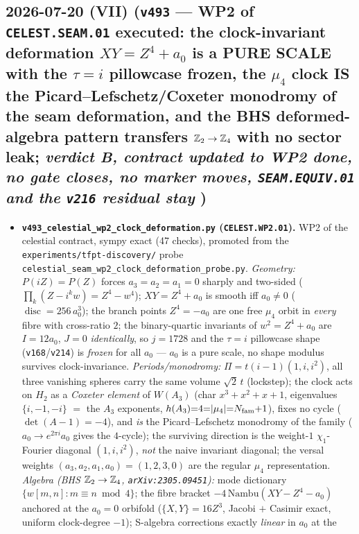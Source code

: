 \subsection*{2026-07-20 (VII) (\texttt{v493} --- WP2 of \texttt{CELEST.SEAM.01} executed: the clock-invariant deformation $XY{=}Z^4{+}a_0$ is a PURE SCALE with the $\tau{=}i$ pillowcase frozen, the $\mu_4$ clock IS the Picard--Lefschetz/Coxeter monodromy of the seam deformation, and the BHS deformed-algebra pattern transfers $\mathbb{Z}_2\to\mathbb{Z}_4$ with no sector leak; \emph{verdict B, contract updated to WP2 done, no gate closes, no marker moves, \texttt{SEAM.EQUIV.01} and the \texttt{v216} residual stay \mO})}
\begin{itemize}[leftmargin=1.5em]
\item \textbf{\texttt{v493\_celestial\_wp2\_clock\_deformation.py} (\texttt{CELEST.WP2.01}).} WP2 of the
celestial contract, sympy exact (47 checks), promoted from the \texttt{experiments/tfpt-discovery/}
probe \texttt{celestial\_seam\_wp2\_clock\_deformation\_probe.py}. \emph{Geometry:}
$P(iZ){=}P(Z)$ forces $a_3{=}a_2{=}a_1{=}0$ sharply and two-sided
($\prod_k(Z-i^kw)=Z^4-w^4$); $XY{=}Z^4{+}a_0$ is smooth iff $a_0{\neq}0$
($\operatorname{disc}=256\,a_0^3$); the branch points $Z^4{=}{-}a_0$ are one free $\mu_4$ orbit in
\emph{every} fibre with cross-ratio $2$; the binary-quartic invariants of $w^2{=}Z^4{+}a_0$ are $I{=}12a_0$,
$J{=}0$ \emph{identically}, so $j{=}1728$ and the $\tau{=}i$ pillowcase shape
(\texttt{v168}/\texttt{v214}) is \emph{frozen} for all $a_0$ --- $a_0$ is a pure scale, no shape modulus
survives clock-invariance. \emph{Periods/monodromy:} $\Pi=t(i{-}1)(1,i,i^2)$, all three vanishing spheres
carry the same volume $\sqrt2\,t$ (lockstep); the clock acts on $H_2$ as a \emph{Coxeter element} of
$W(A_3)$ (char $x^3{+}x^2{+}x{+}1$, eigenvalues $\{i,-1,-i\}$ $=$ the $A_3$ exponents,
$h(A_3){=}4{=}|\mu_4|{=}N_{\mathrm{fam}}{+}1$), fixes no cycle ($\det(A{-}1){=}{-}4$), and \emph{is} the
Picard--Lefschetz monodromy of the family ($a_0\to e^{2\pi i}a_0$ gives the $4$-cycle); the surviving
direction is the weight-$1$ $\chi_1$-Fourier diagonal $(1,i,i^2)$, \emph{not} the naive invariant diagonal;
the versal weights $(a_3,a_2,a_1,a_0)=(1,2,3,0)$ are the regular $\mu_4$ representation. \emph{Algebra
(BHS $\mathbb{Z}_2\to\mathbb{Z}_4$, \texttt{arXiv:2305.09451}):} mode dictionary $\{w[m,n]:m{\equiv}n\bmod4\}$; the fibre
bracket $-4\,\mathrm{Nambu}(XY{-}Z^4{-}a_0)$ anchored at the $a_0{=}0$ orbifold ($\{X,Y\}{=}16Z^3$, Jacobi
$+$ Casimir exact, uniform clock-degree $-1$); S-algebra corrections exactly \emph{linear} in $a_0$ at the

\end{itemize}
